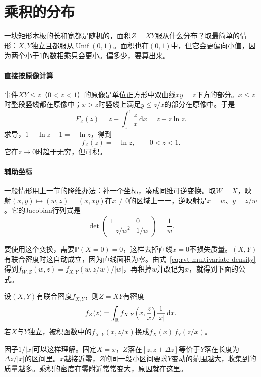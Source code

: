 \section{乘积的分布}
\label{sec:rvt-products}

一块矩形木板的长和宽都是随机的，面积$Z=XY$服从什么分布？取最简单的情形：$X,Y$独立且都服从$\operatorname{Unif}(0,1)$。面积也在$(0,1)$中，但它会更偏向小值，因为两个小于$1$的数相乘只会更小。偏多少，要算出来。

\paragraph{直接按原像计算}
事件$XY\leq z$（$0<z<1$）的原像是单位正方形中双曲线$xy=z$下方的部分。$x\leq z$时整段竖线都在原像中；$x>z$时竖线上满足$y\leq z/x$的部分在原像中。于是
\[
 F_Z(z)=z+\int_z^1\frac{z}{x}\,\mathrm{d}x=z-z\ln z .
\]
求导，$1-\ln z-1=-\ln z$，得到
\begin{equation}
 f_Z(z)=-\ln z,\qquad 0<z<1 .
 \label{eq:rvt-uniform-product}
\end{equation}
它在$z\to0$时趋于无穷，但可积。

\paragraph{辅助坐标}
一般情形用上一节的降维办法：补一个坐标，凑成同维可逆变换。取$W=X$，映射$(x,y)\mapsto(w,z)=(x,xy)$在$x\neq0$的区域上一一，逆映射是$x=w$、$y=z/w$。它的Jacobian行列式是
\[
 \det\begin{pmatrix}1&0\\-z/w^{2}&1/w\end{pmatrix}=\frac1w .
\]

要使用这个变换，需要$\mathbb{P}(X=0)=0$，这样去掉直线$x=0$不损失质量。$(X,Y)$有联合密度时这自动成立，因为直线面积为零。由式~\eqref{eq:rvt-multivariate-density}得到$f_{W,Z}(w,z)=f_{X,Y}(w,z/w)/\lvert w\rvert$，再积掉$w$并改记为$x$，就得到下面的公式。

\begin{theorem}[乘积的密度]
\label{thm:rvt-product-density}
设$(X,Y)$有联合密度$f_{X,Y}$，则$Z=XY$有密度
\begin{equation}
 f_Z(z)=\int_{\mathbb{R}}f_{X,Y}\Bigl(x,\frac zx\Bigr)\frac{1}{\lvert x\rvert}\,\mathrm{d}x .
 \label{eq:rvt-product-density}
\end{equation}
若$X$与$Y$独立，被积函数中的$f_{X,Y}(x,z/x)$换成$f_X(x)\,f_Y(z/x)$。
\end{theorem}

因子$1/\lvert x\rvert$可以这样理解。固定$X=x$，$Z$落在$[z,z+\Delta z]$等价于$Y$落在长度为$\Delta z/\lvert x\rvert$的区间里。$x$越接近零，$Z$的同一段小区间要求$Y$变动的范围越大，收集到的质量越多。乘积的密度在零附近常常变大，原因就在这里。

